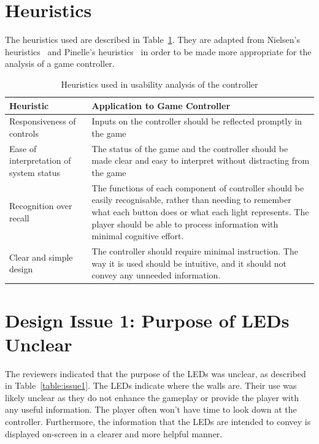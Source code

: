 \documentclass{scrartcl}
\begin{document}
\section{Heuristics}
The heuristics used are described in Table~\ref{table:heuristics}. They are adapted from Nielsen's heuristics~\cite{nielsen:heuristics} and Pinelle's heuristics~\cite{pinelle:heuristic} in order to be made more appropriate for the analysis of a game controller.

\begin{table}
\centering
\begin{tabular}{| l | p{6cm} |}
\hline
\textbf{Heuristic} & \textbf{Application to Game Controller} \\ \hline
Responsiveness of controls & Inputs on the controller should be reflected promptly in the game \\ \hline

Ease of interpretation of system status & The status of the game and the controller should be made clear and easy to interpret without distracting from the game \\ \hline

Recognition over recall & The functions of each component of controller should be easily recognisable, rather than needing to remember what each button does or what each light represents. The player should be able to process information with minimal cognitive effort.\\ \hline

Clear and simple design & The controller should require minimal instruction. The way it is used should be intuitive, and it should not convey any unneeded information.\\ \hline
\end{tabular}
\caption{Heuristics used in usability analysis of the controller}
\label{table:heuristics}
\end{table}

\section{Design Issue 1: Purpose of LEDs Unclear}
The reviewers indicated that the purpose of the LEDs was unclear, as described in Table~\ref{table:issue1}. The LEDs indicate where the walls are. Their use was likely unclear as they do not enhance the gameplay or provide the player with any useful information. The player often won't have time to look down at the controller. Furthermore, the information that the LEDs are intended to convey is displayed on-screen in a clearer and more helpful manner.
\end{document}
